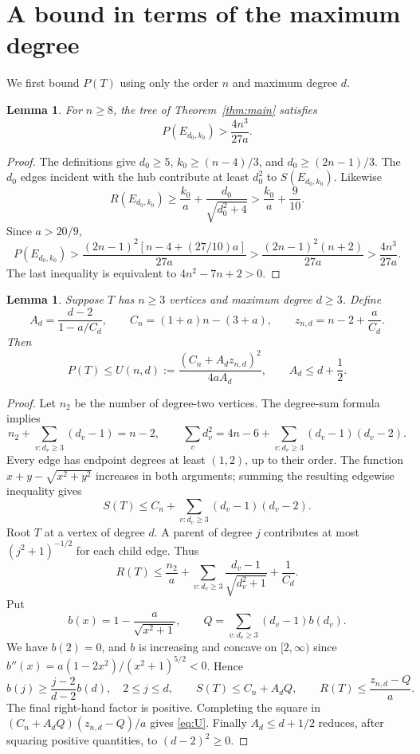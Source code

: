 \documentclass[11pt,a4paper]{article}
\numberwithin{equation}{section}
\newtheorem{lemma}[theorem]{Lemma}
\begin{document}
\section{A bound in terms of the maximum degree}
We first bound $P(T)$ using only the order $n$ and maximum degree $d$.
\begin{lemma}\label{lem:candidate-lower}
For $n\ge8$, the tree of Theorem~\ref{thm:main} satisfies
\[P(E_{d_0,k_0})>\frac{4n^3}{27a}.\]
\end{lemma}
\begin{proof}
The definitions give $d_0\ge5$, $k_0\ge(n-4)/3$, and $d_0\ge(2n-1)/3$. The $d_0$ edges incident with the hub contribute at least $d_0^2$ to $S(E_{d_0,k_0})$. Likewise
\[R(E_{d_0,k_0})\ge\frac{k_0}{a}+\frac{d_0}{\sqrt{d_0^2+4}}>\frac{k_0}{a}+\frac9{10}.
\]
Since $a>20/9$,
\[
P(E_{d_0,k_0})>
\frac{(2n-1)^2[n-4+(27/10)a]}{27a}>
\frac{(2n-1)^2(n+2)}{27a}>\frac{4n^3}{27a}.
\]
The last inequality is equivalent to $4n^2-7n+2>0$.
\end{proof}

\begin{lemma}\label{lem:degree-potential}
Suppose $T$ has $n\ge3$ vertices and maximum degree $d\ge3$. Define
\[
A_d=\frac{d-2}{1-a/C_d},\qquad C_n=(1+a)n-(3+a),\qquad z_{n,d}=n-2+\frac{a}{C_d}.
\]
Then
\begin{equation}\label{eq:U}
P(T)\le U(n,d):=\frac{(C_n+A_dz_{n,d})^2}{4aA_d},
\qquad A_d\le d+\frac12.
\end{equation}
\end{lemma}
\begin{proof}
Let $n_2$ be the number of degree-two vertices. The degree-sum formula implies
\[
n_2+\sum_{v:d_v\ge3}(d_v-1)=n-2,\qquad
\sum_vd_v^2=4n-6+\sum_{v:d_v\ge3}(d_v-1)(d_v-2).
\]
Every edge has endpoint degrees at least $(1,2)$, up to their order. The function $x+y-\sqrt{x^2+y^2}$ increases in both arguments; summing the resulting edgewise inequality gives
\begin{equation}\label{eq:Supper}
S(T)\le C_n+\sum_{v:d_v\ge3}(d_v-1)(d_v-2).
\end{equation}
Root $T$ at a vertex of degree $d$. A parent of degree $j$ contributes at most $(j^2+1)^{-1/2}$ for each child edge. Thus
\[
R(T)\le\frac{n_2}{a}+\sum_{v:d_v\ge3}\frac{d_v-1}{\sqrt{d_v^2+1}}+\frac1{C_d}.
\]
Put
\[b(x)=1-\frac{a}{\sqrt{x^2+1}},\qquad Q=\sum_{v:d_v\ge3}(d_v-1)b(d_v).
\]
We have $b(2)=0$, and $b$ is increasing and concave on $[2,\infty)$ since $b''(x)=a(1-2x^2)/(x^2+1)^{5/2}<0$. Hence
\[b(j)\ge\frac{j-2}{d-2}b(d),\quad 2\le j\le d,\qquad
S(T)\le C_n+A_dQ,\qquad R(T)\le\frac{z_{n,d}-Q}{a}.
\]
The final right-hand factor is positive. Completing the square in
$(C_n+A_dQ)(z_{n,d}-Q)/a$ gives \eqref{eq:U}. Finally $A_d\le d+1/2$ reduces, after squaring positive quantities, to $(d-2)^2\ge0$.
\end{proof}
\end{document}
